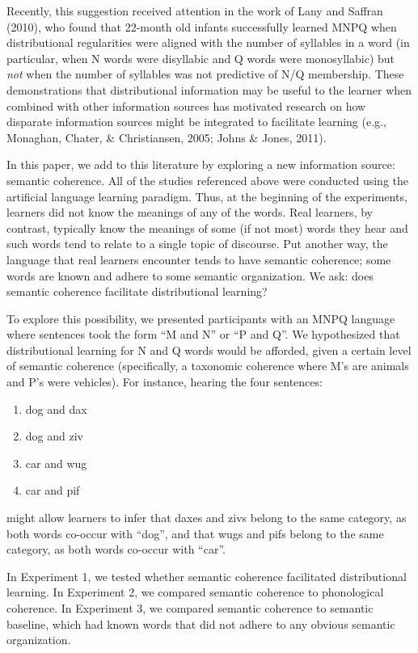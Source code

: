 \documentclass[man,floatsintext]{apa6}
\begin{document}
Recently, this suggestion received attention in the work of Lany and Saffran (2010), who found that 22-month old infants successfully learned MNPQ when distributional regularities were aligned with the number of syllables in a word (in particular, when N words were disyllabic and Q words were monosyllabic) but \emph{not} when the number of syllables was not predictive of N/Q membership. These demonstrations that distributional information may be useful to the learner when combined with other information sources has motivated research on how disparate information sources might be integrated to facilitate learning (e.g., Monaghan, Chater, \& Christiansen, 2005; Johns \& Jones, 2011).

In this paper, we add to this literature by exploring a new information source: semantic coherence. All of the studies referenced above were conducted using the artificial language learning paradigm. Thus, at the beginning of the experiments, learners did not know the meanings of any of the words. Real learners, by contrast, typically know the meanings of some (if not most) words they hear and such words tend to relate to a single topic of discourse. Put another way, the language that real learners encounter tends to have semantic coherence; some words are known and adhere to some semantic organization. We ask: does semantic coherence facilitate distributional learning?

To explore this possibility, we presented participants with an MNPQ language where sentences took the form ``M and N'' or ``P and Q''. We hypothesized that distributional learning for N and Q words would be afforded, given a certain level of semantic coherence (specifically, a taxonomic coherence where M's are animals and P's were vehicles). For instance, hearing the four sentences:
\begin{enumerate}
\item dog and dax
\item dog and ziv
\item car and wug
\item car and pif
\end{enumerate} might allow learners to infer that daxes and zivs belong to the same category, as both words co-occur with ``dog'', and that wugs and pifs belong to the same category, as both words co-occur with ``car''.

In Experiment 1, we tested whether semantic coherence facilitated distributional learning. In Experiment 2, we compared semantic coherence to phonological coherence. In Experiment 3, we compared semantic coherence to semantic baseline, which had known words that did not adhere to any obvious semantic organization.
\end{document}
